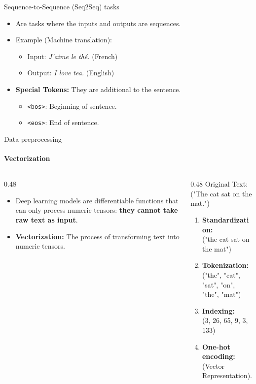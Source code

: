 \documentclass[aspectratio=169]{beamer}
\begin{document}
\begin{frame}{Sequence-to-Sequence (Seq2Seq) tasks}
	\begin{itemize}
		\item Are tasks where the inputs and outputs are sequences.
		\item Example (Machine translation):
		\begin{itemize}
			\item Input: \textit{J'aime le thé.} (French)
			\item Output: \textit{I love tea.} (English)
		\end{itemize}
		\item \textbf{Special Tokens:} They are additional to the sentence.
		\begin{itemize}
			\item \texttt{<bos>}: Beginning of sentence.
			\item \texttt{<eos>}: End of sentence.
		\end{itemize}
	\end{itemize}
\end{frame}

%

\begin{frame}{Data preprocessing}
\framesubtitle{Vectorization}
	\begin{columns}[T] %
		\begin{column}{0.48\textwidth}
			\begin{itemize}
				\item Deep learning models are differentiable functions that can only process numeric tensors: \textbf{they cannot take raw text as input}.
				\vspace{0.5cm}
				\item \textbf{Vectorization:} The process of transforming text into numeric tensors.
			\end{itemize}
		\end{column}
		
		\begin{column}{0.48\textwidth}
			\small
			Original Text: ("The cat sat on the mat.")
			\begin{enumerate}
				\item \textbf{Standardization:} \\ ("the cat sat on the mat")
				\item \textbf{Tokenization:} \\ ("the", "cat", "sat", "on", "the", "mat")
				\item \textbf{Indexing:} \\ (3, 26, 65, 9, 3, 133)
				\item \textbf{One-hot encoding:} \\ (Vector Representation).
			\end{enumerate}
		\end{column}
	\end{columns}
\end{frame}
\end{document}
